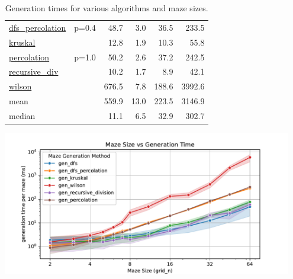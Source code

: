 \documentclass[10pt,a4paper,onecolumn]{article}
\let\origfigure\figure
\let\endorigfigure\endfigure
\renewenvironment{figure}[1][2] {
    \expandafter\origfigure\expandafter[H]
} {
    \endorigfigure
}
\begin{document}
\begin{table}[H]
\begin{tabular}{|ll|r|rrr|}
  \href{https://understanding-search.github.io/maze-dataset/maze_dataset.html#LatticeMazeGenerators.gen_dfs_percolation}{dfs\_percolation}
          & p=0.4                  &   48.7   &    3.0   &   36.5   &  233.5   \\
  \href{https://understanding-search.github.io/maze-dataset/maze_dataset.html#LatticeMazeGenerators.gen_kruskal}{kruskal}
          &                        &   12.8   &    1.9   &   10.3   &   55.8   \\
  \href{https://understanding-search.github.io/maze-dataset/maze_dataset.html#LatticeMazeGenerators.gen_percolation}{percolation}
          & p=1.0                  &   50.2   &    2.6   &   37.2   &  242.5   \\
  \href{https://understanding-search.github.io/maze-dataset/maze_dataset.html#LatticeMazeGenerators.gen_recursive_division}{recursive\_div}
          &                        &   10.2   &    1.7   &    8.9   &   42.1   \\
  \href{https://understanding-search.github.io/maze-dataset/maze_dataset.html#LatticeMazeGenerators.gen_wilson}{wilson}
          &                        &  676.5   &    7.8   &  188.6   & 3992.6   \\
  \hline\hline
  mean
          &                        &  559.9   &   13.0   &  223.5   & 3146.9   \\
  median
          &                        &   11.1   &    6.5   &   32.9   &  302.7   \\
  \hline
\end{tabular}
\caption{Generation times for various algorithms and maze sizes.}
\label{tab:benchmarks}
\end{table}

\begin{figure}
\hypertarget{fig:benchmarks}{%
\centering
\includegraphics[width=0.95\textwidth,height=\textheight]{docs/benchmarks/figures/gridsize-vs-gentime.pdf}
\caption{Plots of maze generation time. Generation time scales
exponentially with maze size for all algorithms (left). Generation time
does not depend on the number of mazes being generated, and there is
minimal overhead to initializing the generation process for a small
dataset (right). Wilson's algorithm is notably less efficient than
others and has high variance. Note that for both plots, values are
averaged across all parameter sets for that algorithm, and
parallelization is disabled.}\label{fig:benchmarks}
}
\end{figure}
\end{document}
